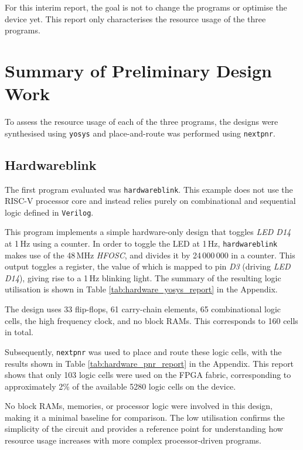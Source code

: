 \documentclass[a4paper,10pt]{article}
\begin{document}
For this interim report, the goal is not to 
change the programs or optimise the device yet.
This report only characterises the resource usage of the three programs.


\section{Summary of Preliminary Design Work}
\label{sec:Summary_of_Preliminary_Design_Work}

To assess the resource usage of each of the three programs, 
the designs were synthesised using \texttt{yosys} 
and place-and-route was performed using \texttt{nextpnr}. 

\subsection{Hardwareblink}
\label{sec:Hardwareblink}

The first program evaluated was \texttt{hardwareblink}.
This example does not use the RISC-V processor core and 
instead relies purely on combinational and 
sequential logic defined in \texttt{Verilog}.

This program implements a simple hardware-only design that 
toggles \textit{LED D14} at 1\,Hz using a counter. 
In order to toggle the LED at 1\,Hz, 
\texttt{hardwareblink} makes use of the 48\,MHz \textit{HFOSC},
and divides it by 24\,000\,000 in a counter.
This output toggles a register, 
the value of which is mapped to pin \textit{D3} (driving \textit{LED D14}),
giving rise to a 1\,Hz blinking light.
The summary of the resulting logic utilisation is shown
in Table \ref{tab:hardware_yosys_report} in the Appendix.

The design uses 33 flip-flops,
61 carry-chain elements,
65 combinational logic cells,
the high frequency clock,
and no block RAMs.
This corresponds to 160 cells in total.

Subsequently, \texttt{nextpnr} was used to place and route these logic cells,
with the results shown in Table \ref{tab:hardware_pnr_report} in the Appendix.
This report shows that only 103 logic cells were used on the FPGA fabric, 
corresponding to approximately 2\% of the available 5280 logic cells 
on the device.

No block RAMs, memories, or processor logic were involved in this design, 
making it a minimal baseline for comparison. 
The low utilisation confirms the simplicity of the circuit 
and provides a reference point for understanding 
how resource usage increases with more complex processor-driven programs.
\end{document}
